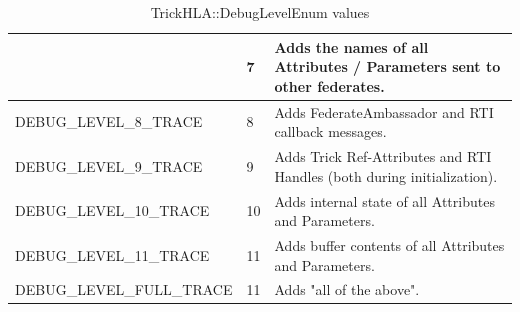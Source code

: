 \begin{table}[ht]
\begin{center}
\begin{tabular}{|p{2in}|l|p{3.25in}|}
      & 7
      & Adds the names of all Attributes / Parameters sent to other federates.
      \\
      \hline
      {\ttfamily DEBUG\_LEVEL\_8\_TRACE}
      & 8
      & Adds FederateAmbassador and RTI callback messages.
      \\
      \hline
      {\ttfamily DEBUG\_LEVEL\_9\_TRACE}
      & 9
      & Adds Trick Ref-Attributes and RTI Handles (both during initialization).
      \\
      \hline
      {\ttfamily DEBUG\_LEVEL\_10\_TRACE}
      & 10
      & Adds internal state of all Attributes and Parameters.
      \\
      \hline
      {\ttfamily DEBUG\_LEVEL\_11\_TRACE}
      & 11
      & Adds buffer contents of all Attributes and Parameters.
      \\
      \hline
      {\ttfamily DEBUG\_LEVEL\_FULL\_TRACE}
      & 11
      & Adds "all of the above".
      \\
      \hline
    \end{tabular}
  \end{center}
  \caption{TrickHLA::DebugLevelEnum values}
  \label{tab:debug_levels}
\end{table}

